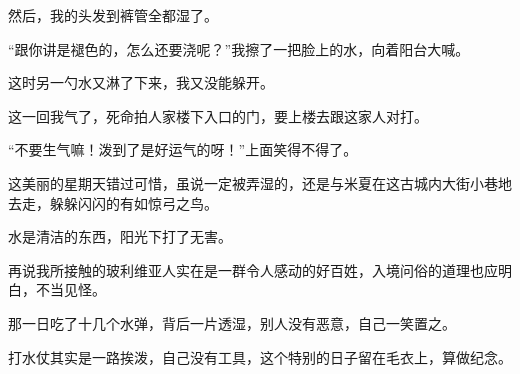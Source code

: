 \par 然后，我的头发到裤管全都湿了。
\par “跟你讲是褪色的，怎么还要浇呢？”我擦了一把脸上的水，向着阳台大喊。
\par 这时另一勺水又淋了下来，我又没能躲开。
\par 这一回我气了，死命拍人家楼下入口的门，要上楼去跟这家人对打。
\par “不要生气嘛！泼到了是好运气的呀！”上面笑得不得了。
\par 这美丽的星期天错过可惜，虽说一定被弄湿的，还是与米夏在这古城内大街小巷地去走，躲躲闪闪的有如惊弓之鸟。
\par 水是清洁的东西，阳光下打了无害。
\par 再说我所接触的玻利维亚人实在是一群令人感动的好百姓，入境问俗的道理也应明白，不当见怪。
\par 那一日吃了十几个水弹，背后一片透湿，别人没有恶意，自己一笑置之。
\par 打水仗其实是一路挨泼，自己没有工具，这个特别的日子留在毛衣上，算做纪念。
